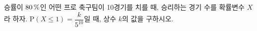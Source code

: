 승률이 $80\mkern3mu \%$인 어떤 프로 축구팀이 10경기를 치를 때, 승리하는 경기 수를 확률변수 $X$라 하자. $\mathrm{P}(X\le 1)=\dfrac{k}{5^{10}}$일 때, 상수 $k$의 값을 구하시오.
